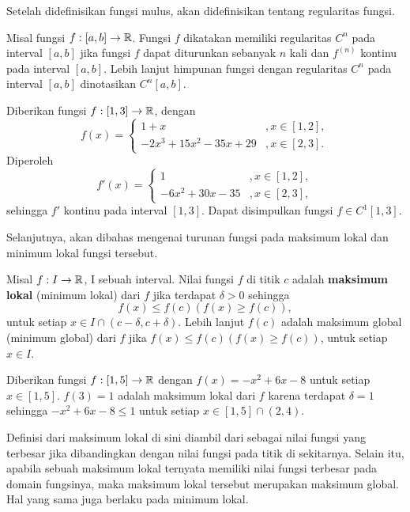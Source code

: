 Setelah didefinisikan fungsi mulus, akan didefinisikan tentang regularitas fungsi.

\begin{definisi}
    Misal fungsi $f:[a,b] \to \mathbb{R}$. Fungsi $f$ dikatakan memiliki regularitas $C^n$ pada interval $[a,b]$ jika fungsi $f$ dapat diturunkan sebanyak $n$ kali dan $f^{(n)}$ kontinu pada interval $[a,b]$. Lebih lanjut himpunan fungsi dengan regularitas $C^n$ pada interval $[a,b]$ dinotasikan $C^n[a,b]$.
\end{definisi}
\begin{contoh}
    Diberikan fungsi $f:[1,3] \to \mathbb{R}$, dengan 
    $$f(x) = 
    \begin{cases}
        1 + x &, x \in [1,2],\\
        -2 x^3 + 15 x^2 - 35 x + 29 &, x\in [2,3]. 
    \end{cases}$$ Diperoleh 
    $$f'(x) =  
    \begin{cases}
        1 &, x \in [1,2],\\
        -6 x^2 + 30 x - 35 &, x\in [2,3],
    \end{cases}$$ 
    sehingga $f'$ kontinu pada interval $[1,3]$. Dapat disimpulkan fungsi $f \in C^1[1,3]$.
\end{contoh}

Selanjutnya, akan dibahas mengenai turunan fungsi pada maksimum lokal dan minimum lokal fungsi tersebut.
\begin{definisi}
    Misal $f:I \to \mathbb{R}$, I sebuah interval. Nilai fungsi $f$ di titik $c$ adalah \textbf{maksimum lokal} (minimum lokal) dari $f$ jika terdapat $\delta>0$ sehingga 
    $$f(x) \leq f(c) (f(x) \geq f(c)),$$
    untuk setiap $x \in I \cap (c-\delta,c+\delta)$. Lebih lanjut $f(c)$ adalah maksimum global (minimum global) dari $f$ jika $f(x) \leq f(c) (f(x) \geq f(c))$, untuk setiap $x \in I$.
\end{definisi}
\begin{contoh}
    Diberikan fungsi $f:[1,5] \to \mathbb{R}$ dengan $f(x)=-x^2+6x-8$ untuk setiap \mbox{$x \in [1,5]$}.  $f(3)=1$ adalah maksimum lokal dari $f$ karena terdapat $\delta = 1$ sehingga $-x^2+6x-8 \leq 1$ untuk setiap $x \in [1,5] \cap (2,4)$.
\end{contoh}

Definisi dari maksimum lokal di sini diambil dari \citep{thomas} sebagai nilai fungsi yang terbesar jika dibandingkan dengan nilai fungsi pada titik di sekitarnya. Selain itu, apabila sebuah maksimum lokal ternyata memiliki nilai fungsi terbesar pada domain fungsinya, maka maksimum lokal tersebut merupakan maksimum global. Hal yang sama juga berlaku pada minimum lokal.

